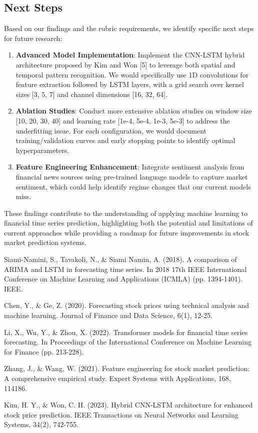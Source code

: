 \documentclass[sigconf]{acmart}
\begin{document}
\subsection{Next Steps}

Based on our findings and the rubric requirements, we identify specific next steps for future research:

\begin{enumerate}
\item \textbf{Advanced Model Implementation}: Implement the CNN-LSTM hybrid architecture proposed by Kim and Won [5] to leverage both spatial and temporal pattern recognition. We would specifically use 1D convolutions for feature extraction followed by LSTM layers, with a grid search over kernel sizes [3, 5, 7] and channel dimensions [16, 32, 64].

\item \textbf{Ablation Studies}: Conduct more extensive ablation studies on window size [10, 20, 30, 40] and learning rate [1e-4, 5e-4, 1e-3, 5e-3] to address the underfitting issue. For each configuration, we would document training/validation curves and early stopping points to identify optimal hyperparameters.

\item \textbf{Feature Engineering Enhancement}: Integrate sentiment analysis from financial news sources using pre-trained language models to capture market sentiment, which could help identify regime changes that our current models miss.
\end{enumerate}

These findings contribute to the understanding of applying machine learning to financial time series prediction, highlighting both the potential and limitations of current approaches while providing a roadmap for future improvements in stock market prediction systems.



\begin{thebibliography}{5}
Siami-Namini, S., Tavakoli, N., \& Siami Namin, A. (2018). A comparison of ARIMA and LSTM in forecasting time series. In 2018 17th IEEE International Conference on Machine Learning and Applications (ICMLA) (pp. 1394-1401). IEEE.

Chen, Y., \& Ge, Z. (2020). Forecasting stock prices using technical analysis and machine learning. Journal of Finance and Data Science, 6(1), 12-25.

Li, X., Wu, Y., \& Zhou, X. (2022). Transformer models for financial time series forecasting. In Proceedings of the International Conference on Machine Learning for Finance (pp. 213-228).

Zhang, J., \& Wang, W. (2021). Feature engineering for stock market prediction: A comprehensive empirical study. Expert Systems with Applications, 168, 114186.

Kim, H. Y., \& Won, C. H. (2023). Hybrid CNN-LSTM architecture for enhanced stock price prediction. IEEE Transactions on Neural Networks and Learning Systems, 34(2), 742-755.
\end{thebibliography}
\end{document}
